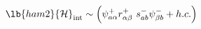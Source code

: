 \begin{equation}
\lb{ham2}
{\cal H}_{\rm int}\sim \left( {\psi }_{{a}{\alpha} }^{+}
r_{\alpha {{\beta }}}^{+}\ s_{a{{b}}}^{-}
\psi_{\beta b}^{-}+h.c.\right)
\end{equation}

